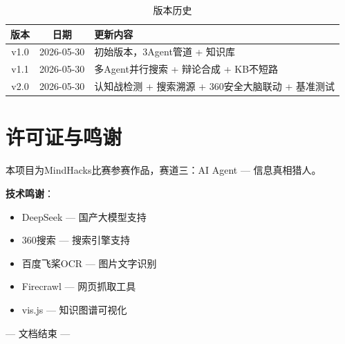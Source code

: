 \documentclass[12pt,a4paper]{ctexart}
\begin{document}
\begin{table}[h]
\centering
\begin{tabular}{|c|c|l|}
\hline
\textbf{版本} & \textbf{日期} & \textbf{更新内容} \\
\hline
v1.0 & 2026-05-30 & 初始版本，3Agent管道 + 知识库 \\
v1.1 & 2026-05-30 & 多Agent并行搜索 + 辩论合成 + KB不短路 \\
v2.0 & 2026-05-30 & 认知战检测 + 搜索溯源 + 360安全大脑联动 + 基准测试 \\
\hline
\end{tabular}
\caption{版本历史}
\end{table}

\section{许可证与鸣谢}

本项目为MindHacks比赛参赛作品，赛道三：AI Agent — 信息真相猎人。

\textbf{技术鸣谢}：
\begin{itemize}[leftmargin=*]
    \item DeepSeek — 国产大模型支持
    \item 360搜索 — 搜索引擎支持
    \item 百度飞桨OCR — 图片文字识别
    \item Firecrawl — 网页抓取工具
    \item vis.js — 知识图谱可视化
\end{itemize}

\vspace{1cm}
\begin{center}
\color{gray}
--- 文档结束 ---
\end{center}
\end{document}
